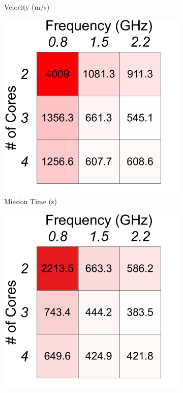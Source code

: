 {\begin{figure}[t!]
\begin{subfigure}[t!]{.3\columnwidth}
    \caption{Velocity (m/s)}
     \label{fig:benchmarks:OPA:mapping:velocity}
    \end{subfigure}
    \begin{subfigure}[t!]{.3\columnwidth}
    \centering
    \includegraphics[width=\columnwidth]{figs/mapping_flight_time_operating_point}
    \caption{Mission Time (s)}
    \label{fig:benchmarks:OPA:mapping:time}
    \end{subfigure}
    \begin{subfigure}[t!]{.3\columnwidth}
    \centering
    \includegraphics[width=\columnwidth] {figs/mapping_energy_operating_point}

\end{subfigure}
\end{figure}}
